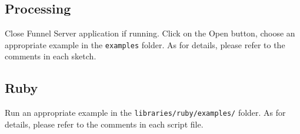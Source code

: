 \documentclass[9pt]{jsarticle}
\begin{document}
\subsection{Processing}
Close Funnel Server application if running. Click on the Open button, choose an appropriate example in the \texttt{examples} folder. As for details, please refer to the comments in each sketch.

\subsection{Ruby}
Run an appropriate example in the \texttt{libraries/ruby/examples/} folder. As for details, please refer to the comments in each script file.
\end{document}
